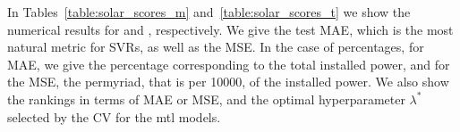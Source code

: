 \begin{table}[t!]
   \caption{Wilcoxon $p$-values for absolute (left) and quadratic (right) errors.}
   \centering
   \label{table:solar_wilcoxon}
\end{table}

In Tables~\ref{table:solar_scores_m} and~\ref{table:solar_scores_t} we show the numerical results for  and , respectively. We give the test MAE, which is the most natural metric for SVRs, as well as the MSE. 
In the case of percentages, for MAE, we give the percentage corresponding to the total installed power, and for the MSE, the permyriad, that is per \num{10000}, of the installed power.
%
We also show the rankings in terms of MAE or MSE, and the optimal hyperparameter $\lambda^*$ selected by the CV for the \acrshort{mtl} models.
%

